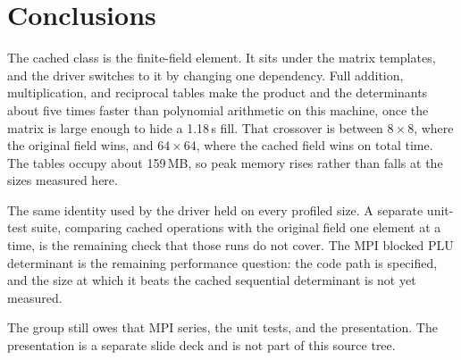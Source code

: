 \section{Conclusions}
\label{sec:conclusions}

The cached class is the finite-field element.
It sits under the matrix templates, and the driver switches to it by changing one dependency.
Full addition, multiplication, and reciprocal tables make the product and the determinants about five times faster than polynomial arithmetic on this machine, once the matrix is large enough to hide a 1.18\,s fill.
That crossover is between \(8 \times 8\), where the original field wins, and \(64 \times 64\), where the cached field wins on total time.
The tables occupy about 159\,MB, so peak memory rises rather than falls at the sizes measured here.

The same identity used by the driver held on every profiled size.
A separate unit-test suite, comparing cached operations with the original field one element at a time, is the remaining check that those runs do not cover.
The MPI blocked PLU determinant is the remaining performance question: the code path is specified, and the size at which it beats the cached sequential determinant is not yet measured.

The group still owes that MPI series, the unit tests, and the presentation.
The presentation is a separate slide deck and is not part of this source tree.
